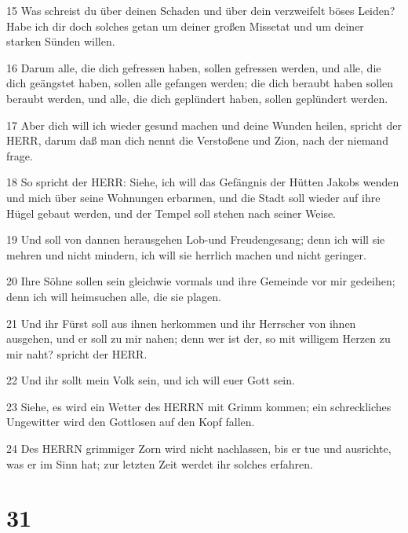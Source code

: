 \par 15 Was schreist du über deinen Schaden und über dein verzweifelt böses Leiden? Habe ich dir doch solches getan um deiner großen Missetat und um deiner starken Sünden willen.
\par 16 Darum alle, die dich gefressen haben, sollen gefressen werden, und alle, die dich geängstet haben, sollen alle gefangen werden; die dich beraubt haben sollen beraubt werden, und alle, die dich geplündert haben, sollen geplündert werden.
\par 17 Aber dich will ich wieder gesund machen und deine Wunden heilen, spricht der HERR, darum daß man dich nennt die Verstoßene und Zion, nach der niemand frage.
\par 18 So spricht der HERR: Siehe, ich will das Gefängnis der Hütten Jakobs wenden und mich über seine Wohnungen erbarmen, und die Stadt soll wieder auf ihre Hügel gebaut werden, und der Tempel soll stehen nach seiner Weise.
\par 19 Und soll von dannen herausgehen Lob-und Freudengesang; denn ich will sie mehren und nicht mindern, ich will sie herrlich machen und nicht geringer.
\par 20 Ihre Söhne sollen sein gleichwie vormals und ihre Gemeinde vor mir gedeihen; denn ich will heimsuchen alle, die sie plagen.
\par 21 Und ihr Fürst soll aus ihnen herkommen und ihr Herrscher von ihnen ausgehen, und er soll zu mir nahen; denn wer ist der, so mit willigem Herzen zu mir naht? spricht der HERR.
\par 22 Und ihr sollt mein Volk sein, und ich will euer Gott sein.
\par 23 Siehe, es wird ein Wetter des HERRN mit Grimm kommen; ein schreckliches Ungewitter wird den Gottlosen auf den Kopf fallen.
\par 24 Des HERRN grimmiger Zorn wird nicht nachlassen, bis er tue und ausrichte, was er im Sinn hat; zur letzten Zeit werdet ihr solches erfahren.

\chapter{31}

